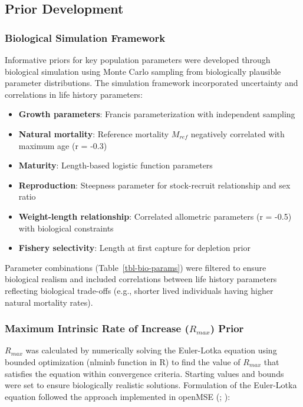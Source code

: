 \documentclass[
  11pt,
]{SCreport}
\providecommand{\tightlist}{%
  \setlength{\itemsep}{0pt}\setlength{\parskip}{0pt}}\usepackage{longtable,booktabs,array}
\begin{document}
\subsection{Prior Development}\label{sec-prior-development}

\subsubsection{Biological Simulation
Framework}\label{sec-biological-simulation}

Informative priors for key population parameters were developed through
biological simulation using Monte Carlo sampling from biologically
plausible parameter distributions. The simulation framework incorporated
uncertainty and correlations in life history parameters:

\begin{itemize}
\tightlist
\item
  \textbf{Growth parameters}: Francis parameterization with independent
  sampling
\item
  \textbf{Natural mortality}: Reference mortality \(M_{ref}\) negatively
  correlated with maximum age (r = -0.3)
\item
  \textbf{Maturity}: Length-based logistic function parameters
\item
  \textbf{Reproduction}: Steepness parameter for stock-recruit
  relationship and sex ratio
\item
  \textbf{Weight-length relationship}: Correlated allometric parameters
  (r = -0.5) with biological constraints
\item
  \textbf{Fishery selectivity}: Length at first capture for depletion
  prior
\end{itemize}

Parameter combinations (Table~\ref{tbl-bio-params}) were filtered to
ensure biological realism and included correlations between life history
parameters reflecting biological trade-offs (e.g., shorter lived
individuals having higher natural mortality rates).

\subsubsection{\texorpdfstring{Maximum Intrinsic Rate of Increase
(\(R_{max}\))
Prior}{Maximum Intrinsic Rate of Increase (R\_\{max\}) Prior}}\label{sec-rmax-prior}

\(R_{max}\) was calculated by numerically solving the Euler-Lotka
equation using bounded optimization (nlminb function in R) to find the
value of \(R_{max}\) that satisfies the equation within convergence
criteria. Starting values and bounds were set to ensure biologically
realistic solutions. Formulation of the Euler-Lotka equation followed
the approach implemented in openMSE
(;
):
\end{document}
